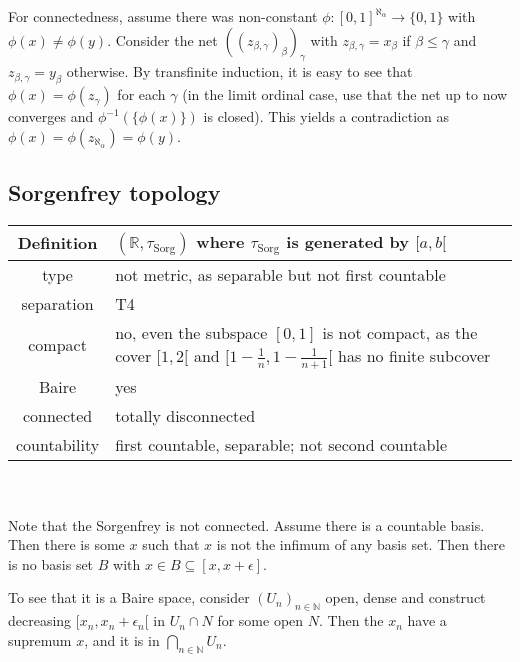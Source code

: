 \documentclass{scrartcl}
\newcommand{\R}{\mathbb{R}}
\newcommand{\N}{\mathbb{N}}
\begin{document}
For connectedness, assume there was non-constant $\phi: [0,1]^{\aleph_\alpha} \to \{0,1\}$ with $\phi(x) \neq \phi(y)$. Consider the net $((z_{\beta,\gamma})_\beta)_\gamma$ with $z_{\beta,\gamma} = x_\beta$ if $\beta \leq \gamma$ and $z_{\beta,\gamma}=y_\beta$ otherwise.
By transfinite induction, it is easy to see that $\phi(x) = \phi(z_\gamma)$ for each $\gamma$ (in the limit ordinal case, use that the net up to now converges and $\phi^{-1}(\{\phi(x)\})$ is closed). This yields a contradiction as $\phi(x) = \phi(z_{\aleph_\alpha}) = \phi(y)$.

\subsection{Sorgenfrey topology}
\label{top:sorgenfrey}
\begin{tabular}{c | p{}}
    Definition & $(\R, \tau_{\mathrm{Sorg}})$ where $\tau_{\mathrm{Sorg}}$ is generated by $[a, b[$ \\
    \hline
    type & not metric, as separable but not first countable \\
    separation & T4 \\
    compact & no, even the subspace $[0, 1]$ is not compact, as the cover $[1, 2[$ and $[1 - \frac 1 n, 1 - \frac 1 {n + 1}[$ has no finite subcover \\
    Baire & yes \\
    connected & totally disconnected \\
    countability & first countable, separable; not second countable
\end{tabular}
\\\\
Note that the Sorgenfrey is not connected. Assume there is a countable basis. Then there is some $x$ such that $x$ is not the infimum of any basis set. Then there is no basis set $B$ with $x \in B \subseteq [x, x + \epsilon]$.

To see that it is a Baire space, consider $(U_n)_{n \in \N}$ open, dense and construct decreasing $[x_n, x_n + \epsilon_n[$ in $U_n \cap N$ for some open $N$. Then the $x_n$ have a supremum $x$, and it is in $\bigcap_{n \in \N} U_n$.
\end{document}
